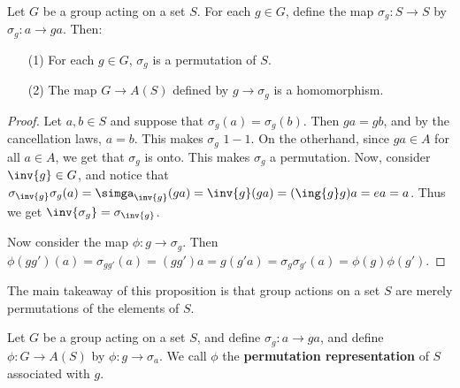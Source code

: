 \begin{proposition}\label{1.7.1}
    Let $G$ be a group acting on a set $S$. For each $g \in G$, define the map
    $\sigma_g:S \rightarrow S$ by $\sigma_g:a \rightarrow ga$. Then:
    \begin{enumerate}
        \item[(1)] For each $g \in G$,  $\sigma_g$ is a permutation of  $S$.

        \item [(2)] The map $G \rightarrow A(S)$ defined by $g \rightarrow
            \sigma_g$ is a homomorphism.
    \end{enumerate}
\end{proposition}
\begin{proof}
    Let $a,b \in S$ and suppose that $\sigma_g(a)=\sigma_g(b)$. Then $ga=gb$,
    and by the cancellation laws,  $a=b$. This makes $\sigma_g$  $1-1$. On the
    otherhand, since $ga \in A$ for all $a \in A$, we get that $\sigma_g$ is
    onto. This makes  $\sigma_g$ a permutation. Now, consider  $\inv{g} \in G$,
    and notice that
    $\sigma_{\inv{g}}\sigma_g(a)=\simga_{\inv{g}}(ga)=\inv{g}(ga)=(\ing{g}g)a=ea=a$.
    Thus we get $\inv{\sigma_g}=\sigma_{\inv{g}}$.

    Now consider the map $\phi:g \rightarrow \sigma_g$. Then
    $\phi(gg')(a)=\sigma_{gg'}(a)=(gg')a=g(g'a)=\sigma_g\sigma_{g'}(a)=
    \phi(g)\phi(g')$.
\end{proof}
\begin{remark}
    The main takeaway of this proposition is that group actions on a set $S$ are
    merely permutations of the elements of  $S$.
\end{remark}

\begin{definition}
    Let $G$ be a group acting on a set  $S$, and define $\sigma_g:a \rightarrow
    ga$, and define $\phi:G \rightarrow A(S)$ by $\phi:g \rightarrow \sigma_a$.
    We call $\phi$ the  \textbf{permutation representation} of $S$ associated
    with  $g$.
\end{definition}

